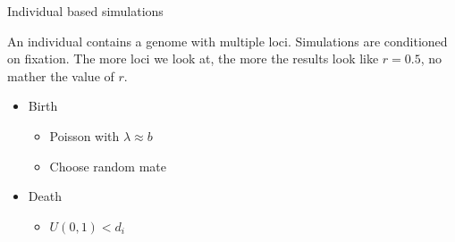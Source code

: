 \documentclass{beamer}
\begin{document}
\begin{frame}{Individual based simulations}
    
    An individual contains a genome with multiple loci. Simulations are conditioned on fixation. The more loci we look at, the more the results look like $r=0.5$, no mather the value of $r$.
    
    \vfill

    \begin{minipage}{0.45\textwidth}
    \begin{itemize}
      \item Birth \\
          \begin{itemize}
          \item{Poisson with  $\lambda \approx b$}
          \item{Choose random mate}
        \end{itemize}
      \item Death \\
      \begin{itemize}
          \item $\textit{U}(0,1) < d_i$
      \end{itemize}
    \end{itemize}
    \end{minipage}%
    \hfill
    \begin{minipage}{0.45\textwidth}
    \end{minipage}%


\end{frame}
\end{document}
